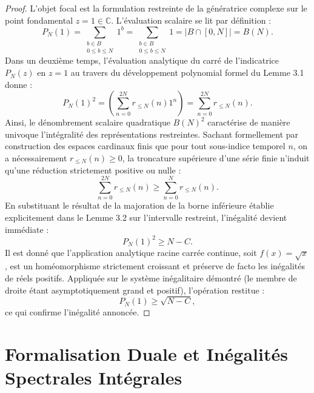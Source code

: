 \documentclass[12pt,a4paper]{article}
\begin{document}
\begin{proof}
L'objet focal est la formulation restreinte de la g\'en\'eratrice complexe sur le point fondamental $z=1 \in \mathbb{C}$.
L'\'evaluation scalaire se lit par d\'efinition :
\begin{equation}
P_N(1) = \sum_{\substack{b \in B \\ 0 \le b \le N}} 1^b = \sum_{\substack{b \in B \\ 0 \le b \le N}} 1 = | B \cap [0, N] | = B(N).
\end{equation}
Dans un deuxi\`eme temps, l'\'evaluation analytique du carr\'e de l'indicatrice $P_N(z)$ en $z=1$ au travers du d\'eveloppement polynomial formel du Lemme 3.1 donne :
\begin{equation}
P_N(1)^2 = \left( \sum_{n=0}^{2N} r_{\le N}(n) 1^n \right) = \sum_{n=0}^{2N} r_{\le N}(n).
\end{equation}
Ainsi, le d\'enombrement scalaire quadratique $B(N)^2$ caract\'erise de mani\`ere univoque l'int\'egralit\'e des repr\'esentations restreintes.
Sachant formellement par construction des espaces cardinaux finis que pour tout sous-indice temporel $n$, on a n\'ecessairement $r_{\le N}(n) \ge 0$, la troncature sup\'erieure d'une s\'erie finie n'induit qu'une r\'eduction strictement positive ou nulle :
\begin{equation}
\sum_{n=0}^{2N} r_{\le N}(n) \ge \sum_{n=0}^{N} r_{\le N}(n).
\end{equation}
En substituant le r\'esultat de la majoration de la borne inf\'erieure \'etablie explicitement dans le Lemme 3.2 sur l'intervalle restreint, l'in\'egalit\'e devient imm\'ediate :
\begin{equation}
P_N(1)^2 \ge N - C.
\end{equation}
Il est donn\'e que l'application analytique racine carr\'ee continue, soit $f(x) = \sqrt{x}$, est un hom\'eomorphisme strictement croissant et pr\'eserve de facto les in\'egalit\'es de r\'eels positifs. Appliqu\'ee sur le syst\`eme in\'egalitaire d\'emontr\'e (le membre de droite \'etant asymptotiquement grand et positif), l'op\'eration restitue :
\begin{equation}
P_N(1) \ge \sqrt{N - C},
\end{equation}
ce qui confirme l'in\'egalit\'e annonc\'ee.
\end{proof}

\section{Formalisation Duale et In\'egalit\'es Spectrales Int\'egrales}
\end{document}
